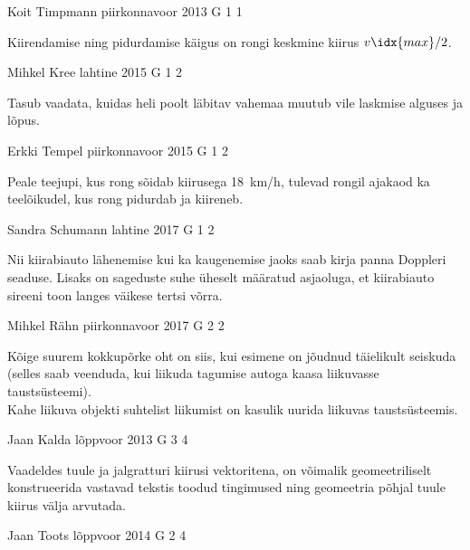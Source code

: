 \documentclass[11pt]{article}
\begin{document}
{%
{Koit Timpmann} %
{piirkonnavoor} %
{2013} %
{G 1} %
{1} %
{

\ifHint
Kiirendamise ning pidurdamise käigus on rongi keskmine kiirus $v\idx{max}/2$.
\fi
}

{Mihkel Kree} %
{lahtine} %
{2015} %
{G 1} %
{2} %
{

\ifHint
Tasub vaadata, kuidas heli poolt läbitav vahemaa muutub vile laskmise alguses ja lõpus.
\fi
}

{Erkki Tempel} %
{piirkonnavoor} %
{2015} %
{G 1} %
{2} %
{

\ifHint
Peale teejupi, kus rong sõidab kiirusega \SI{18}{km/h}, tulevad rongil ajakaod ka teelõikudel, kus rong pidurdab ja kiireneb.
\fi
}

{Sandra Schumann} %
{lahtine} %
{2017} %
{G 1} %
{2} %
{

\ifHint
Nii kiirabiauto lähenemise kui ka kaugenemise jaoks saab kirja panna Doppleri seaduse. Lisaks on sageduste suhe üheselt määratud asjaoluga, et kiirabiauto sireeni toon langes väikese tertsi võrra.
\fi
}

{Mihkel Rähn} %
{piirkonnavoor} %
{2017} %
{G 2} %
{2} %
{

\ifHint
\osa Kõige suurem kokkupõrke oht on siis, kui esimene on jõudnud täielikult seiskuda (selles saab veenduda, kui liikuda tagumise autoga kaasa liikuvasse taustsüsteemi).\\
\osa Kahe liikuva objekti suhtelist liikumist on kasulik uurida liikuvas taustsüsteemis.
\fi
}

{Jaan Kalda} %
{lõppvoor} %
{2013} %
{G 3} %
{4} %
{

\ifHint
Vaadeldes tuule ja jalgratturi kiirusi vektoritena, on võimalik geomeetriliselt konstrueerida vastavad tekstis toodud tingimused ning geomeetria põhjal tuule kiirus välja arvutada.
\fi
}

{Jaan Toots} %
{lõppvoor} %
{2014} %
{G 2} %
{4} %
{

}}
\end{document}
